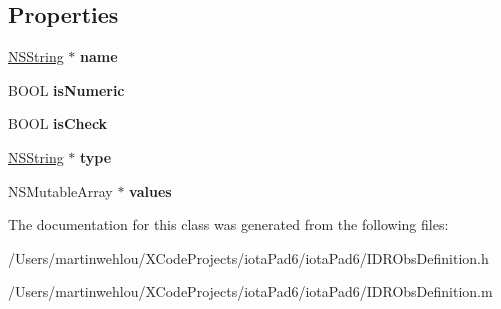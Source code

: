 \subsection*{Properties}
\begin{DoxyCompactItemize}
\item 
\hypertarget{interface_i_d_r_obs_definition_aef6b24d9089a9bcb3351d04654ea5e9d}{
\hyperlink{class_n_s_string}{NSString} $\ast$ {\bfseries name}}
\label{interface_i_d_r_obs_definition_aef6b24d9089a9bcb3351d04654ea5e9d}

\item 
\hypertarget{interface_i_d_r_obs_definition_ac61b9793cfc7ca8b913e3322c69c19b3}{
BOOL {\bfseries isNumeric}}
\label{interface_i_d_r_obs_definition_ac61b9793cfc7ca8b913e3322c69c19b3}

\item 
\hypertarget{interface_i_d_r_obs_definition_a12297d1b1a02729dee201359a856a2aa}{
BOOL {\bfseries isCheck}}
\label{interface_i_d_r_obs_definition_a12297d1b1a02729dee201359a856a2aa}

\item 
\hypertarget{interface_i_d_r_obs_definition_aebad1ae7fa6a6a8def8d49425b29c993}{
\hyperlink{class_n_s_string}{NSString} $\ast$ {\bfseries type}}
\label{interface_i_d_r_obs_definition_aebad1ae7fa6a6a8def8d49425b29c993}

\item 
\hypertarget{interface_i_d_r_obs_definition_ab521025d3a43e46c7a866d9b50cc5818}{
NSMutableArray $\ast$ {\bfseries values}}
\label{interface_i_d_r_obs_definition_ab521025d3a43e46c7a866d9b50cc5818}

\end{DoxyCompactItemize}


The documentation for this class was generated from the following files:\begin{DoxyCompactItemize}
\item 
/Users/martinwehlou/XCodeProjects/iotaPad6/iotaPad6/IDRObsDefinition.h\item 
/Users/martinwehlou/XCodeProjects/iotaPad6/iotaPad6/IDRObsDefinition.m\end{DoxyCompactItemize}
